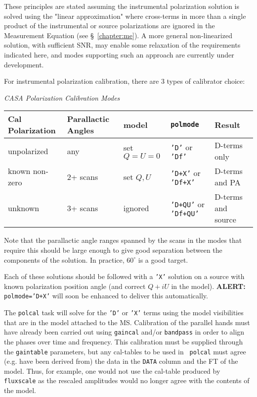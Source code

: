 {These principles are stated assuming the instrumental polarization
solution is solved using the "linear approximation" where cross-terms
in more than a single product of the instrumental or source
polarizations are ignored in the Measurement Equation (see 
\S~\ref{chapter:me}).
A more general non-linearized solution, with sufficient SNR, may enable 
some relaxation of the requirements indicated here, and modes supporting
such an approach are currently under development.

For instrumental polarization calibration, there are 3 types of
calibrator choice:
\begin{center}
{\it CASA Polarization Calibration Modes}\\[5mm]
\begin{tabular}{|l|l|l|l|l|}
\hline
Cal Polarization & Parallactic Angles & model & 
    {\tt polmode} & Result \\
\hline
unpolarized & any & set $Q=U=0$ & {\tt 'D'} or {\tt 'Df'} & D-terms
  only \\
known non-zero & 2+ scans & set $Q,U$ & {\tt 'D+X'} or 
  {\tt 'Df+X'} & D-terms and PA \\
unknown & 3+ scans & ignored & {\tt 'D+QU'} or {\tt 'Df+QU'} &
  D-terms and source \\
\hline
\end{tabular}
\end{center}
Note that the parallactic angle ranges spanned by the scans in the
modes that require this should be large enough to give good separation
between the components of the solution.  In practice, $60^\circ$ is 
a good target.

Each of these solutions should be followed with a {\tt 'X'} solution
on a source with known polarization position angle (and correct $Q+iU$
in the model).  
{\bf ALERT:} {\tt polmode='D+X'} will soon be enhanced to 
deliver this automatically.
           
The {\tt polcal} task will solve for the {\tt 'D'} or {\tt 'X'} terms
using the model visibilities that are in the model attached to the MS.
Calibration of the parallel hands must have already been carried out
using {\tt gaincal} and/or {\tt bandpass} in order to align the phases
over time and frequency.  This calibration must be supplied through
the {\tt gaintable} parameters, but any cal-tables to be used in {\tt
  polcal} must agree (e.g. have been derived from) the data in the
{\tt DATA} column and the FT of the model.  Thus, for example, one
would not use the cal-table produced by {\tt fluxscale} as the
rescaled amplitudes would no longer agree with the contents of the model.

}

